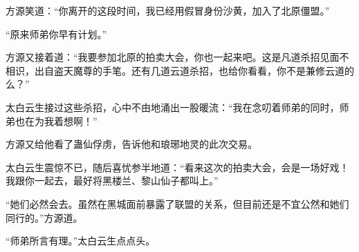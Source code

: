 \begin{this_body}
方源笑道：“你离开的这段时间，我已经用假冒身份沙黄，加入了北原僵盟。”

“原来师弟你早有计划。”

方源又接着道：“我要参加北原的拍卖大会，你也一起来吧。这是凡道杀招见面不相识，出自盗天魔尊的手笔。还有几道云道杀招，也给你看看，你不是兼修云道的么？”

太白云生接过这些杀招，心中不由地涌出一股暖流：“我在念叨着师弟的同时，师弟也在为我着想啊！”

方源又给他看了蛊仙俘虏，告诉他和琅琊地灵的此次交易。

太白云生震惊不已，随后喜忧参半地道：“看来这次的拍卖大会，会是一场好戏！我跟你一起去，最好将黑楼兰、黎山仙子都叫上。”

“她们必然会去。虽然在黑城面前暴露了联盟的关系，但目前还是不宜公然和她们同行的。”方源道。

“师弟所言有理。”太白云生点点头。

\end{this_body}

